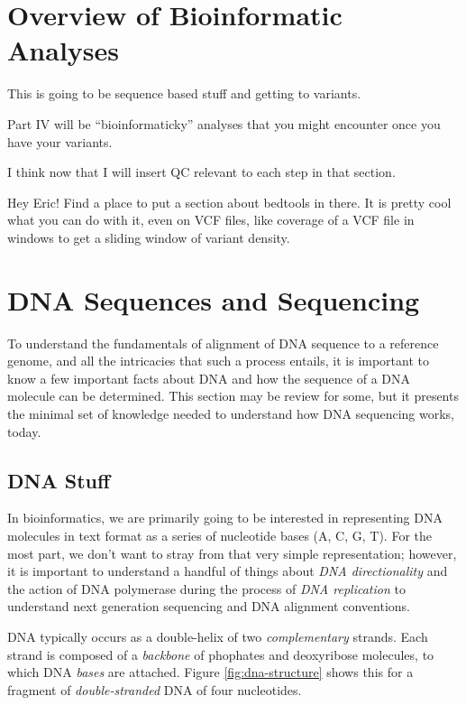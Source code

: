 \documentclass[]{krantz}
\begin{document}
\hypertarget{overview-of-bioinformatic-analyses}{%
\chapter{Overview of Bioinformatic Analyses}\label{overview-of-bioinformatic-analyses}}

This is going to be sequence based stuff and getting
to variants.

Part IV will be ``bioinformaticky'' analyses that you might encounter once
you have your variants.

I think now that I will insert QC relevant to each step in that section.

Hey Eric! Find a place to put a section about bedtools in there. It is pretty
cool what you can do with it, even on VCF files, like coverage of a VCF file in
windows to get a sliding window of variant density.

\hypertarget{dna-sequences-and-sequencing}{%
\chapter{DNA Sequences and Sequencing}\label{dna-sequences-and-sequencing}}

To understand the fundamentals of alignment of DNA sequence to a reference
genome, and all the intricacies that such a process entails, it is important
to know a few important facts about DNA and how the sequence of a DNA molecule
can be determined. This section may be review for some, but it presents the minimal
set of knowledge needed to understand how DNA sequencing works, today.

\hypertarget{dna-stuff}{%
\section{DNA Stuff}\label{dna-stuff}}

In bioinformatics, we are primarily going to be interested in representing DNA molecules
in text format as a series of nucleotide bases (A, C, G, T). For the most part, we don't want
to stray from that very simple representation; however, it is important to understand a
handful of things about \emph{DNA directionality} and the action of DNA polymerase during the
process of \emph{DNA replication} to understand next generation sequencing and DNA alignment
conventions.

DNA typically occurs as a double-helix of two \emph{complementary} strands. Each strand is composed of a
\emph{backbone} of phophates and deoxyribose molecules, to which DNA \emph{bases} are attached. Figure \ref{fig:dna-structure} shows this for a fragment of \emph{double-stranded} DNA of four nucleotides.
\end{document}
